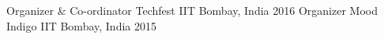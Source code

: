 \begin{cvhonors}
  \cvhonor
    {Organizer \& Co-ordinator}
    {Techfest}
    {IIT Bombay, India}
    {2016}
  \cvhonor
    {Organizer}
    {Mood Indigo}
    {IIT Bombay, India}
    {2015}
\end{cvhonors}
